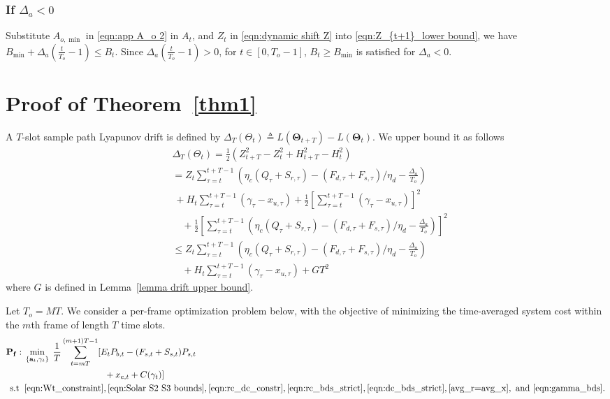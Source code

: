 \documentclass[journal]{IEEEtran}
\def\Thetabf{\boldsymbol \Theta}
\def\abf{{\bf a}}
\def\nn{\nonumber}
\begin{document}
\subsubsection{If $\Delta_a<0$}
Substitute $A_{o,\min}$ in \eqref{eqn:app A_o 2} in $A_t$, and $Z_t$ in \eqref{eqn:dynamic shift Z} into \eqref{eqn:Z_{t+1}_lower bound}, we have
 $B_{\min}+\Delta_a(\frac{t}{T_o}-1)\leq B_t$.
Since $\Delta_a(\frac{t}{T_o}-1)>0$, for $t\in [0,T_o-1]$,  $B_t\geq B_{\min}$ is satisfied for $\Delta_a<0$.
\endIEEEproof


\section{Proof of Theorem~\ref{thm1}}\label{appD}
\IEEEproof
A $T$-slot sample path Lyapunov drift is defined by $\Delta_T(\Theta_t)\triangleq L(\Thetabf_{t+T})-L(\Thetabf_{t})$. We upper bound it as follows
{
\allowdisplaybreaks
\begin{align}\label{eqn:app3_Delta_T}
&\Delta_T(\Theta_t)
=\frac{1}{2}\left( Z^2_{t+T}-Z^2_{t}+H^2_{t+T}-H^2_{t}\right)\nn\\
&=Z_t\sum_{\tau=t}^{t+T-1}\left( \eta_c(Q_\tau+S_{r,\tau})-(F_{d,\tau}+F_{s,\tau})/\eta_d-\frac{\Delta_a}{T_o}\right)\nn\\
&\ +H_t\sum_{\tau=t}^{t+T-1}\left(\gamma_\tau-x_{u,\tau}\right)+\frac{1}{2}\left[\sum_{\tau=t}^{t+T-1}\left(\gamma_\tau-x_{u,\tau}\right)\right]^2\nn\\
&\quad+\frac{1}{2}\left[\sum_{\tau=t}^{t+T-1}\left(\eta_c(Q_\tau+S_{r,\tau})-(F_{d,\tau}+F_{s,\tau})/\eta_d-\frac{\Delta_a}{T_o}\right)\right]^2\nn\\
&\leq Z_t\sum_{\tau=t}^{t+T-1}\left(\eta_c(Q_\tau+S_{r,\tau})-(F_{d,\tau}+F_{s,\tau})/\eta_d-\frac{\Delta_a}{T_o}\right)\nn\\
&\quad+H_t\sum_{\tau=t}^{t+T-1}(\gamma_\tau-x_{u,\tau})+G T^2
\end{align}
}where $G$ is defined in Lemma~\ref{lemma drift upper bound}.

Let $T_o=MT$. We consider a per-frame optimization problem below,
with the objective of minimizing the time-averaged system cost within the $m$th frame of length $T$ time slots.
\begin{align}
{\bf \textrm{\bf P}_f:} \; &\min_{\{\abf_t,\gamma_t\}} \;
\frac{1}{T}\sum_{t=mT}^{(m+1)T-1}[E_tP_{b,t}-(F_{s,t}+S_{s,t})P_{s,t}\nn\\
&\hspace{9em}+x_{e,t}+C(\gamma_t)]\nn\\
\rm{s.t} \;\;
&\eqref{eqn:Wt_constraint},\eqref{eqn:Solar S2 S3 bounds},\eqref{eqn:rc_dc_constr},
\eqref{eqn:rc_bds_strict},\eqref{eqn:dc_bds_strict},\eqref{avg_r=avg_x},\ \textnormal{and}\ \eqref{eqn:gamma_bds}.\nn
\end{align}
\end{document}
